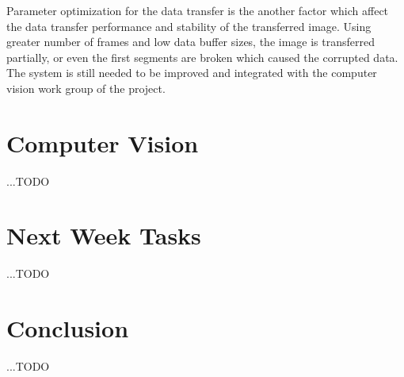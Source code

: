 \documentclass[12pt]{article}
\begin{document}
Parameter optimization for the data transfer is the another factor which affect the data transfer performance and stability of the transferred image. Using greater number of frames and low data buffer sizes, the image is transferred partially, or even the first segments are broken which caused the corrupted data. The system is still needed to be improved and integrated with the computer vision work group of the project.
\pagebreak

\section{Computer Vision}
\label{sec:vision}
...TODO
\pagebreak


\section{Next Week Tasks}
\label{sec:tasks}
...TODO
\pagebreak


\section{Conclusion}
\label{sec:conclusion}
...TODO

\newpage


\end{document}
